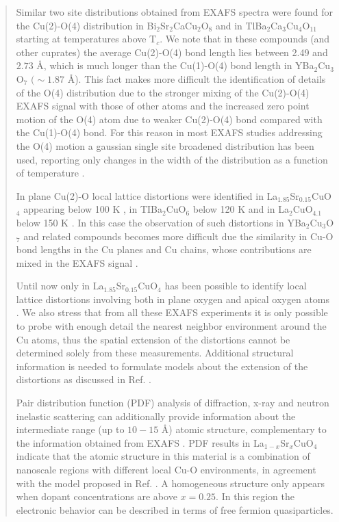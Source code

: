 \begin{quote}
Similar two site distributions obtained from EXAFS spectra were found for the Cu(2)-O(4) distribution in Bi$_{2}$Sr$_{2}$CaCu$_{2}$O$_{8}$ \cite{bianconni1992lattice} and in TlBa$_{2}$Ca$_{3}$Cu$_{4}$O$_{11}$ \cite{Allen1991} starting at temperatures above T$_{c}$. 
We note that in these compounds (and other cuprates) the average Cu(2)-O(4) bond length lies between 2.49 and $2.73$ \AA, which is much longer than the Cu(1)-O(4) bond length in YBa$_{2}$Cu$_{3}$O$_{7}$ $(\sim 1.87$ \AA). 
This fact makes more difficult the identification of details of the O(4) distribution due to the stronger mixing of the Cu(2)-O(4) EXAFS signal with those of other atoms and the increased zero point motion of the O(4) atom due to weaker Cu(2)-O(4) bond compared with the Cu(1)-O(4) bond.
For this reason in most EXAFS studies addressing the O(4) motion a gaussian single site broadened distribution has been used, reporting only changes in the width of the distribution as a function of temperature \cite{Booth1995,Oyanagi2007,Zhang2009}.

In plane  Cu(2)-O local lattice distortions were identified in La$_{1.85}$Sr$_{0.15}$CuO$_{4}$ appearing below 100 K \cite{Bianconi1996,Oyanagi2007},  in TIBa$_{2}$CuO$_{6}$ below 120 K \cite{Conradson1997} and in La$_{2}$CuO$_{4.1}$ below 150 K \cite{Lanzara1997,MustredeLeon:xj5003}. 
In this case the observation of such distortions in YBa$_{2}$Cu$_{3}$O$_{7}$ and related compounds becomes more difficult due the similarity  in Cu-O bond lengths in the Cu planes and Cu chains, whose contributions are mixed in the EXAFS signal \cite{Conradson1997,MustredeLeon1992a}.

Until now only in La$_{1.85}$Sr$_{0.15}$CuO$_{4}$ has been possible to identify local lattice distortions involving both in plane oxygen and apical oxygen atoms  \cite{Bianconi1996}. 
We also stress that from all these EXAFS experiments it is only possible to probe with enough detail the nearest neighbor environment around the Cu atoms, thus the spatial extension of the distortions cannot be determined solely from these measurements. 
Additional structural information \cite{Bianconi1996a} is needed to formulate models about the extension of the distortions as discussed in Ref. \cite{Bianconi1996}.

Pair distribution function (PDF) analysis of diffraction, x-ray and neutron inelastic scattering can additionally provide information about the intermediate range (up to $10-15$ \AA)  atomic structure, complementary to the information obtained from EXAFS \cite{Egami2003}. 
PDF results in La$_{1-x}$Sr$_{x}$CuO$_{4}$ \cite{Bozin1999,Bozin2000} indicate that the atomic structure in this material is a combination of nanoscale regions with different local Cu-O environments, in agreement with the model proposed in Ref. \cite{Bianconi1996}. 
A homogeneous structure only appears when dopant concentrations are above $x = 0.25$. 
In this region the electronic behavior can be described in terms of free fermion quasiparticles.


\end{quote}
